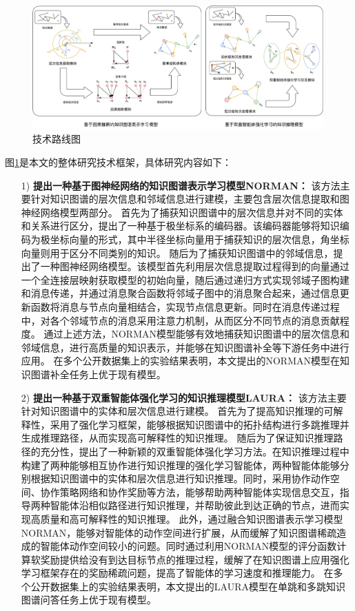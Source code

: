 \documentclass[algorithmlist, AutoFakeBold, AutoFakeSlant, figurelist, tablelist, nomlist, engineering]{seuthesix}
\begin{document}
\begin{figure}[t]
  \centering
  \includegraphics[width=1.0\textwidth]{1_Total}
  \caption{技术路线图}
  \label{1_Total}
\end{figure}
图\ref{1_Total}是本文的整体研究技术框架，具体研究内容如下：
\begin{itemize}
  \item [1)]\textbf{提出一种基于图神经网络的知识图谱表示学习模型NORMAN：}
  该方法主要针对知识图谱的层次信息和邻域信息进行建模，主要包含层次信息提取和图神经网络模型两部分。
  首先为了捕获知识图谱中的层次信息并对不同的实体和关系进行区分，提出了一种基于极坐标系的编码器。该编码器能够将知识编码为极坐标向量的形式，其中半径坐标向量用于捕获知识的层次信息，角坐标向量则用于区分不同类别的知识。
  随后为了捕获知识图谱中的邻域信息，提出了一种图神经网络模型。该模型首先利用层次信息提取过程得到的向量通过一个全连接层映射获取模型的初始向量，随后通过递归方式实现邻域子图构建和消息传递，并通过消息聚合函数将邻域子图中的消息聚合起来，通过信息更新函数将消息与节点向量相结合，实现节点信息更新。同时在消息传递过程中，对各个邻域节点的消息采用注意力机制，从而区分不同节点的消息贡献程度。
  通过上述方法，NORMAN模型能够有效地捕获知识图谱中的层次信息和邻域信息，进行高质量的知识表示，并能够在知识图谱补全等下游任务中进行应用。
  在多个公开数据集上的实验结果表明，本文提出的NORMAN模型在知识图谱补全任务上优于现有模型。
  \item [2)]\textbf{提出一种基于双重智能体强化学习的知识推理模型LAURA：}
  该方法主要针对知识图谱中的实体和层次信息进行建模。
  首先为了提高知识推理的可解释性，采用了强化学习框架，能够根据知识图谱中的拓扑结构进行多跳推理并生成推理路径，从而实现高可解释性的知识推理。
  随后为了保证知识推理路径的充分性，提出了一种新颖的双重智能体强化学习方法。在知识推理过程中构建了两种能够相互协作进行知识推理的强化学习智能体，两种智能体能够分别根据知识图谱中的实体和层次信息进行知识推理。同时，采用协作动作空间、协作策略网络和协作奖励等方法，能够帮助两种智能体实现信息交互，指导两种智能体沿相似路径进行知识推理，并帮助彼此到达正确的节点，进而实现高质量和高可解释性的知识推理。
  此外，通过融合知识图谱表示学习模型NORMAN，能够对智能体的动作空间进行扩展，从而缓解了知识图谱稀疏造成的智能体动作空间较小的问题。同时通过利用NORMAN模型的评分函数计算软奖励提供给没有到达目标节点的推理过程，缓解了在知识图谱上应用强化学习框架存在的奖励稀疏问题，提高了智能体的学习速度和推理能力。
  在多个公开数据集上的实验结果表明，本文提出的LAURA模型在单跳和多跳知识图谱问答任务上优于现有模型。
\end{itemize}
\end{document}
